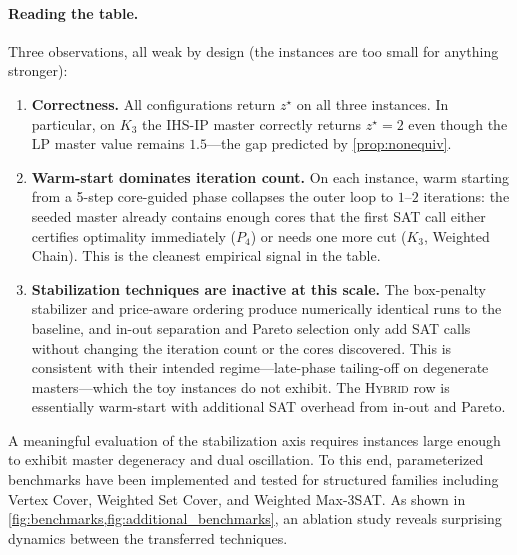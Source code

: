\paragraph{Reading the table.} Three observations, all weak by design (the
instances are too small for anything stronger):
\begin{enumerate}
\item \textbf{Correctness.} All configurations return $z^\star$ on all three
instances. In particular, on $K_3$ the IHS-IP master correctly returns
$z^\star = 2$ even though the LP master value remains $1.5$---the gap predicted
by \cref{prop:nonequiv}.

\item \textbf{Warm-start dominates iteration count.} On each instance, warm
starting from a 5-step core-guided phase collapses the outer loop to
$1$--$2$ iterations: the seeded master already contains enough cores that the
first SAT call either certifies optimality immediately ($P_4$) or needs one
more cut ($K_3$, Weighted Chain). This is the cleanest empirical signal in the
table.

\item \textbf{Stabilization techniques are inactive at this scale.} The
box-penalty stabilizer and price-aware ordering produce numerically identical
runs to the baseline, and
in-out separation and Pareto selection only add SAT calls without changing the
iteration count or the cores discovered. This is consistent with their
intended regime---late-phase tailing-off on degenerate masters---which the
toy instances do not exhibit. The \textsc{Hybrid} row is essentially
warm-start with additional SAT overhead from in-out and Pareto.
\end{enumerate}

A meaningful evaluation of the stabilization axis requires instances large
enough to exhibit master degeneracy and dual oscillation. To this end, 
parameterized benchmarks have been implemented and tested for structured families 
including Vertex Cover, Weighted Set Cover, and Weighted Max-3SAT. 
As shown in \cref{fig:benchmarks,fig:additional_benchmarks}, 
an ablation study reveals surprising dynamics between the transferred techniques. 


